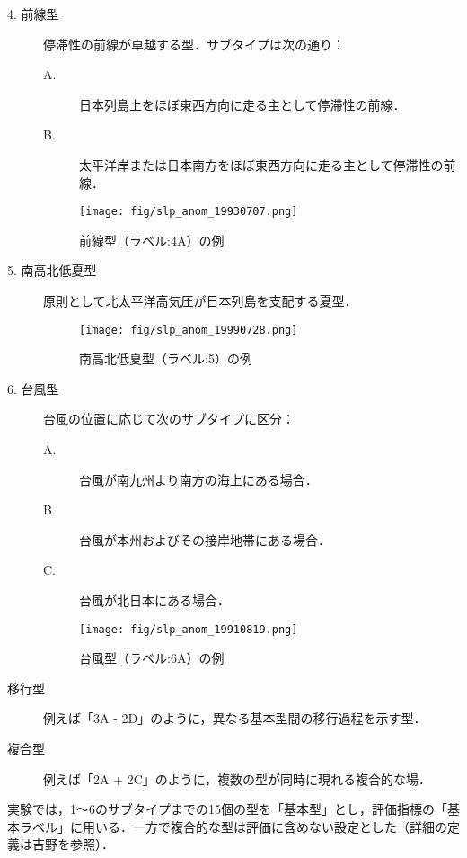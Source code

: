 \documentclass{jarticle}
\theoremstyle{definition}
\begin{document}
\begin{description}
\item[4. 前線型] 停滞性の前線が卓越する型．サブタイプは次の通り：
  \begin{description}
    \item[A.] 日本列島上をほぼ東西方向に走る主として停滞性の前線．
    \item[B.] 太平洋岸または日本南方をほぼ東西方向に走る主として停滞性の前線．
  \end{description}

\begin{figure}[H] \centering \texttt{[image: fig/slp\_anom\_19930707.png]} \caption{前線型（ラベル:4A）の例} \label{fig:slp_anom_19930707} \end{figure}

\item[5. 南高北低夏型] 原則として北太平洋高気圧が日本列島を支配する夏型．

\begin{figure}[H] \centering \texttt{[image: fig/slp\_anom\_19990728.png]} \caption{南高北低夏型（ラベル:5）の例} \label{fig:slp_anom_19990728} \end{figure}

\item[6. 台風型] 台風の位置に応じて次のサブタイプに区分：
  \begin{description}
    \item[A.] 台風が南九州より南方の海上にある場合．
    \item[B.] 台風が本州およびその接岸地帯にある場合．
    \item[C.] 台風が北日本にある場合．
  \end{description}

\begin{figure}[H] \centering \texttt{[image: fig/slp\_anom\_19910819.png]} \caption{台風型（ラベル:6A）の例} \label{fig:slp_anom_19910819} \end{figure}
  
\item[移行型] 例えば「3A - 2D」のように，異なる基本型間の移行過程を示す型．
\item[複合型] 例えば「2A + 2C」のように，複数の型が同時に現れる複合的な場．
\end{description}

実験では，1〜6のサブタイプまでの15個の型を「基本型」とし，評価指標の「基本ラベル」に用いる．一方で複合的な型は評価に含めない設定とした（詳細の定義は吉野\cite{吉野2002日本の気候}を参照）．
\end{document}
